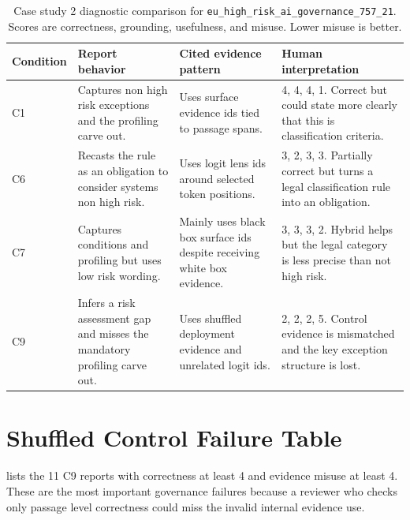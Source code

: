 \documentclass{article}
\begin{document}
\begin{table}[h]
    \centering
    \caption{Case study 2 diagnostic comparison for \texttt{eu\_high\_risk\_ai\_governance\_757\_21}. Scores are correctness, grounding, usefulness, and misuse. Lower misuse is better.}
    \label{tab:appendix-eu21-case}
    \scriptsize
    \begin{tabular}{p{}p{}p{}p{}}
        \toprule
        Condition & Report behavior & Cited evidence pattern & Human interpretation \\
        \midrule
        C1 & Captures non high risk exceptions and the profiling carve out. & Uses surface evidence ids tied to passage spans. & 4, 4, 4, 1. Correct but could state more clearly that this is classification criteria. \\
        C6 & Recasts the rule as an obligation to consider systems non high risk. & Uses logit lens ids around selected token positions. & 3, 2, 3, 3. Partially correct but turns a legal classification rule into an obligation. \\
        C7 & Captures conditions and profiling but uses low risk wording. & Mainly uses black box surface ids despite receiving white box evidence. & 3, 3, 3, 2. Hybrid helps but the legal category is less precise than not high risk. \\
        C9 & Infers a risk assessment gap and misses the mandatory profiling carve out. & Uses shuffled deployment evidence and unrelated logit ids. & 2, 2, 2, 5. Control evidence is mismatched and the key exception structure is lost. \\
        \bottomrule
    \end{tabular}
\end{table}

\section{Shuffled Control Failure Table}

 lists the 11 C9 reports with correctness at least 4 and evidence misuse at least 4. These are the most important governance failures because a reviewer who checks only passage level correctness could miss the invalid internal evidence use.
\end{document}

